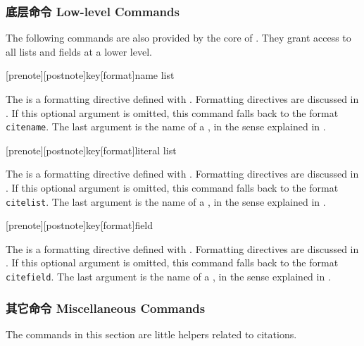 \subsubsection{底层命令 Low-level Commands}
\label{use:cit:low}

The following commands are also provided by the core of \biblatex. They grant access to all lists and fields at a lower level.

\begin{ltxsyntax}

[prenote][postnote]{key}[format]{name list}

The  is a formatting directive defined with . Formatting directives are discussed in . If this optional argument is omitted, this command falls back to the format \texttt{citename}. The last argument is the name of a , in the sense explained in .

[prenote][postnote]{key}[format]{literal list}

The  is a formatting directive defined with . Formatting directives are discussed in . If this optional argument is omitted, this command falls back to the format \texttt{citelist}. The last argument is the name of a , in the sense explained in .

[prenote][postnote]{key}[format]{field}

The  is a formatting directive defined with . Formatting directives are discussed in . If this optional argument is omitted, this command falls back to the format \texttt{citefield}. The last argument is the name of a , in the sense explained in .

\end{ltxsyntax}

\subsubsection{其它命令 Miscellaneous Commands}
\label{use:cit:msc}

The commands in this section are little helpers related to citations.

